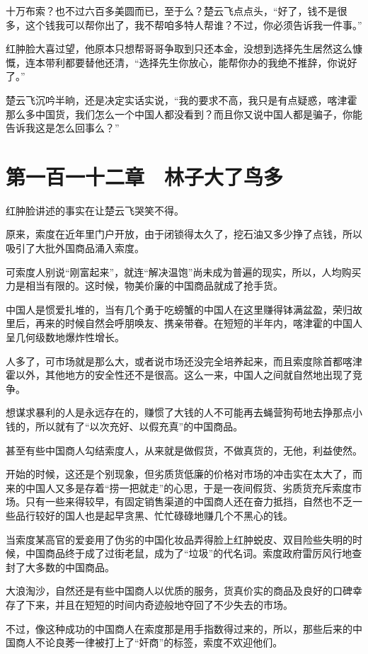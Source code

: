 十万布索？也不过六百多美圆而已，至于么？楚云飞点点头，“好了，钱不是很多，这个钱我可以帮你出了，我不帮咱多特人帮谁？不过，你必须告诉我一件事。”

红肿脸大喜过望，他原本只想帮哥哥争取到只还本金，没想到选择先生居然这么慷慨，连本带利都要替他还清，“选择先生你放心，能帮你办的我绝不推辞，你说好了。”

楚云飞沉吟半晌，还是决定实话实说，“我的要求不高，我只是有点疑惑，喀津霍那么多中国货，我们怎么一个中国人都没看到？而且你又说中国人都是骗子，你能告诉我这是怎么回事么？”

\section{第一百一十二章　林子大了鸟多}

红肿脸讲述的事实在让楚云飞哭笑不得。

原来，索度在近年里门户开放，由于闭锁得太久了，挖石油又多少挣了点钱，所以吸引了大批外国商品涌入索度。

可索度人别说“刚富起来”，就连“解决温饱”尚未成为普遍的现实，所以，人均购买力是相当有限的。这时候，物美价廉的中国商品就成了抢手货。

中国人是惯爱扎堆的，当有几个勇于吃螃蟹的中国人在这里赚得钵满盆盈，荣归故里后，再来的时候自然会呼朋唤友、携亲带眷。在短短的半年内，喀津霍的中国人呈几何级数地爆炸性增长。

人多了，可市场就是那么大，或者说市场还没完全培养起来，而且索度除首都喀津霍以外，其他地方的安全性还不是很高。这么一来，中国人之间就自然地出现了竞争。

想谋求暴利的人是永远存在的，赚惯了大钱的人不可能再去蝇营狗苟地去挣那点小钱的，所以就有了“以次充好、以假充真”的中国商品。

甚至有些中国商人勾结索度人，从来就是做假货，不做真货的，无他，利益使然。

开始的时候，这还是个别现象，但劣质货低廉的价格对市场的冲击实在太大了，而来的中国人又多是存着“捞一把就走”的心思，于是一夜间假货、劣质货充斥索度市场。只有一些来得较早，有固定销售渠道的中国商人还在奋力抵挡，自然也不乏一些品行较好的国人也是起早贪黑、忙忙碌碌地赚几个不黑心的钱。

当索度某高官的爱妾用了伪劣的中国化妆品弄得脸上红肿蜕皮、双目险些失明的时候，中国商品终于成了过街老鼠，成为了“垃圾”的代名词。索度政府雷厉风行地查封了大多数的中国商品。

大浪淘沙，自然还是有些中国商人以优质的服务，货真价实的商品及良好的口碑幸存了下来，并且在短短的时间内奇迹般地夺回了不少失去的市场。

不过，像这种成功的中国商人在索度那是用手指数得过来的，所以，那些后来的中国商人不论良莠一律被打上了“奸商”的标签，索度不欢迎他们。

